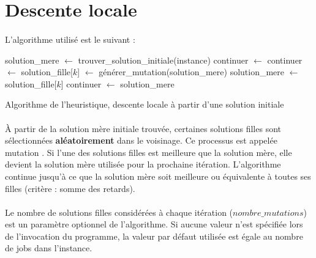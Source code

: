 \section{Descente locale}

\paragraph{}
L'algorithme utilisé est le suivant :

\begin{algorithm}[H] %
\begin{algorithmic}
\STATE solution\_mere $ \leftarrow $ trouver\_solution\_initiale(instance)
\STATE continuer $ \leftarrow $ \TRUE
{}
\STATE continuer $ \leftarrow $ \FALSE
\STATE {}
\STATE solution\_fille[$ k $] $ \leftarrow $ générer\_mutation(solution\_mere)
\STATE {}
\ENDFOR
\STATE {}
\STATE solution\_mere $ \leftarrow $ solution\_fille[$ k $]
\STATE continuer $ \leftarrow $ \TRUE { } 
\ENDIF
\ENDFOR
\ENDWHILE
\RETURN solution\_mere
\end{algorithmic}
\caption{\label{alg:heuristique}Algorithme de l'heuristique, descente locale à partir d'une solution initiale}
\end{algorithm}

\paragraph{}
À partir de la solution \og mère \fg{} initiale trouvée, certaines solutions \og filles \fg{} sont sélectionnées \textbf{aléatoirement} dans le voisinage.
Ce processus est appelée \og mutation \fg{}.
Si l'une des solutions filles est meilleure que la solution mère, elle devient la solution mère utilisée pour la prochaine itération.
L'algorithme continue jusqu'à ce que la solution mère soit meilleure ou équivalente à toutes ses filles (critère : somme des retards).

\paragraph{}
Le nombre de solutions filles considérées à chaque itération ($ nombre\_mutations $) est un paramètre optionnel de l'algorithme.
Si aucune valeur n'est spécifiée lors de l'invocation du programme, la valeur par défaut utilisée est égale au nombre de jobs dans l'instance.